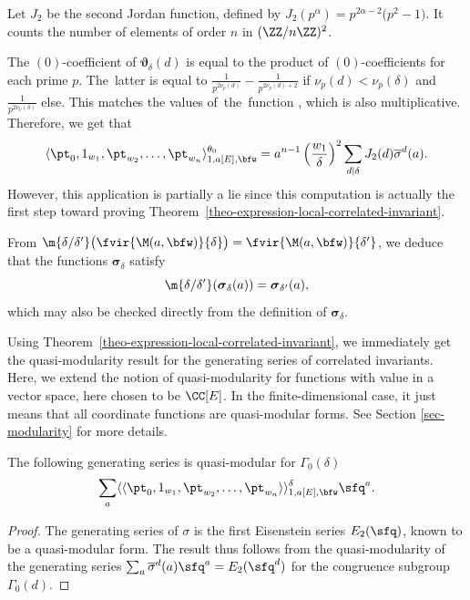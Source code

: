 \begin{expl}
 Let $J_2$ be the second Jordan function, defined by $J_2(p^\alpha)=p^{2\alpha-2}\bigl(p^2-1\bigr)$. It counts the number of elements of order $n$ in $(\ZZ/n\ZZ)^2$.

 The $(0)$-coefficient of $\boldsymbol{\vartheta}_\delta(d)$ is equal to the product of $(0)$-coefficients for each prime $p$. The~latter is equal to $\frac{1}{p^{2\nu_p(d)}}\!-\!\frac{1}{p^{2\nu_p(d)+2}}$ if $\nu_p(d)\!<\!\nu_p(\delta)$ and $\frac{1}{p^{2\nu_p(\delta)}}$ else. This matches the values of~the~function , which is also multiplicative. Therefore,
 we get that
 \[ \langle \pt_0,1_{w_1},\pt_{w_2},\dots,\pt_{w_n}\rangle^{\theta_0}_{1,a[E],\bfw} =a^{n-1}\left(\frac{w_1}{\delta}\right)^2\sum_{d|\delta}J_2(d)\overline{\sigma}^d(a). \]
 However, this application is partially a lie since this computation is actually the first step toward proving Theorem~\ref{theo-expression-local-correlated-invariant}.
\end{expl}

From $\m{\delta/\delta'}\bigl(\fvir{\M(a,\bfw)}{\delta}\bigr) = \fvir{\M(a,\bfw)}{\delta'}$, we deduce that the functions $\boldsymbol{\sigma}_\delta$ satisfy
\[ \m{\delta/\delta'}(\boldsymbol{\sigma}_\delta(a)) = \boldsymbol{\sigma}_{\delta'}(a),\]
which may also be checked directly from the definition of $\boldsymbol{\sigma}_\delta$.

Using Theorem~\ref{theo-expression-local-correlated-invariant}, we immediately get the quasi-modularity result for the generating series of correlated invariants. Here, we extend the notion of quasi-modularity for functions with value in a vector space, here chosen to be $\CC[E]$. In the finite-dimensional case, it just means that all coordinate functions are quasi-modular forms. See Section \ref{sec-modularity} for more details.

\begin{coro}
The following generating series is quasi-modular for $\Gamma_0(\delta)$
\[ \sum_a \langle\langle \pt_0,1_{w_1},\pt_{w_2},\dots,\pt_{w_n} \rangle\rangle^\delta_{1,a[E],\bfw}\sfq^a.\]
\end{coro}

\begin{proof}
 The generating series of $\sigma$ is the first Eisenstein series $E_2(\sfq)$, known to be a quasi-modular form. The result thus follows from the quasi-modularity of the generating series $\sum_a \overline{\sigma}^d(a)\sfq^a = E_2(\sfq^d)$ for the congruence subgroup $\Gamma_0(d)$.
\end{proof}

